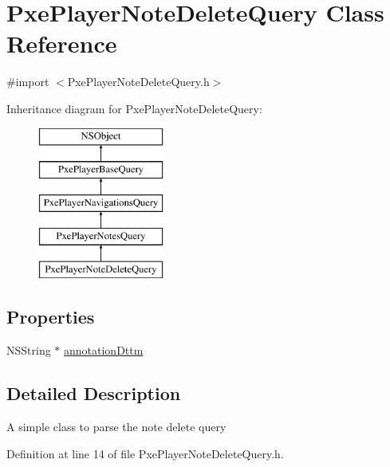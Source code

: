 \hypertarget{interface_pxe_player_note_delete_query}{\section{Pxe\-Player\-Note\-Delete\-Query Class Reference}
\label{interface_pxe_player_note_delete_query}
}


{\ttfamily \#import $<$Pxe\-Player\-Note\-Delete\-Query.\-h$>$}

Inheritance diagram for Pxe\-Player\-Note\-Delete\-Query\-:\begin{figure}[H]
\begin{center}
\leavevmode
\includegraphics[height=5.000000cm]{interface_pxe_player_note_delete_query}
\end{center}
\end{figure}
\subsection*{Properties}
\begin{DoxyCompactItemize}
\item 
N\-S\-String $\ast$ \hyperlink{interface_pxe_player_note_delete_query_a8664e285d989554c799c8f60491d4916}{annotation\-Dttm}
\end{DoxyCompactItemize}


\subsection{Detailed Description}
A simple class to parse the note delete query 

Definition at line 14 of file Pxe\-Player\-Note\-Delete\-Query.\-h.



